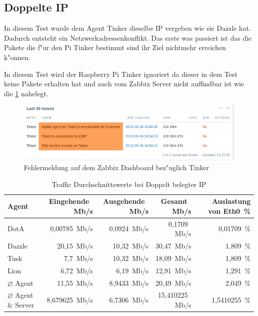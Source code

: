 \subsection{Doppelte IP}

In diesem Test wurde dem Agent Tinker dieselbe IP vergeben wie sie Dazzle hat. Dadurch entsteht ein Netzwerkadressenkonflikt. %
Das erste was passiert ist das die Pakete die f"ur den Pi Tinker bestimmt sind ihr Ziel nichtmehr erreichen k"onnen. %

In diesem Test wird der Raspberry Pi Tinker ignoriert da dieser in dem Test keine Pakete erhalten hat und auch vom %
Zabbix Server nicht auffindbar ist wie die \cref{fig:fehlermeldungenTinker} nahelegt.

\begin{figure}[htbp]
\centering
\includegraphics*[width=0.9\linewidth]{Abb/ZabbixTinker/DoppelteIP/TinkerFaults}

\caption{Fehlermeldung auf dem Zabbix Dashboard bez"uglich Tinker}
\label{fig:fehlermeldungenTinker}
\end{figure}

\begin{table}
\centering
\begin{tabular}{l%
 r<{\,Mb/s}%
 r<{\,Mb/s}%
 r<{\,Mb/s}%
 r<{\,\%}%
}
Agent  				& Eingehende		& Ausgehende		& Gesamt		& Auslastung von Eth0	\\
\hline
DotA				& 0,00785		& 0,0924		& 0,1709		&  0,01709 		\\
Dazzle 				& 20,15			& 10,32			& 30,47			& 1,809		\\
Tusk 				& 7,7			& 10,32			& 18,09			& 1,809		\\
Lion				& 6,72			& 6,19			& 12,91			& 1,291		\\
$\diameter $ Agent 		& 11,55 		& 8,9433 		& 20,49			& 2,049 		\\   
$\diameter $ Agent \& Server 	& 8,679625 		& 6,7306		& 15,410225		& 1,5410255		\\

\end{tabular}
\caption{Traffic Durchschnittswerte bei Doppelt belegter IP}
\label{tab:DoppelteIPTraffic}
\end{table}

